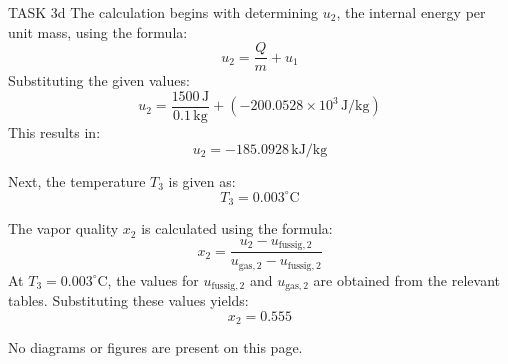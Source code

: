 TASK 3d  
The calculation begins with determining \( u_2 \), the internal energy per unit mass, using the formula:  
\[
u_2 = \frac{Q}{m} + u_1
\]  
Substituting the given values:  
\[
u_2 = \frac{1500 \, \text{J}}{0.1 \, \text{kg}} + (-200.0528 \times 10^3 \, \text{J/kg})
\]  
This results in:  
\[
u_2 = -185.0928 \, \text{kJ/kg}
\]  

Next, the temperature \( T_3 \) is given as:  
\[
T_3 = 0.003^\circ \text{C}
\]  

The vapor quality \( x_2 \) is calculated using the formula:  
\[
x_2 = \frac{u_2 - u_{\text{fussig},2}}{u_{\text{gas},2} - u_{\text{fussig},2}}
\]  
At \( T_3 = 0.003^\circ \text{C} \), the values for \( u_{\text{fussig},2} \) and \( u_{\text{gas},2} \) are obtained from the relevant tables. Substituting these values yields:  
\[
x_2 = 0.555
\]  

No diagrams or figures are present on this page.